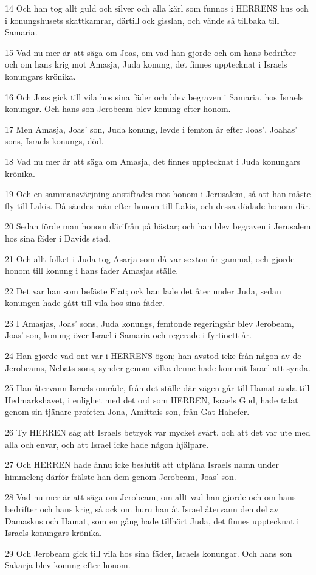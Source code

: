 \par 14 Och han tog allt guld och silver och alla kärl som funnos i HERRENS hus och i konungshusets skattkamrar, därtill ock gisslan, och vände så tillbaka till Samaria.
\par 15 Vad nu mer är att säga om Joas, om vad han gjorde och om hans bedrifter och om hans krig mot Amasja, Juda konung, det finnes upptecknat i Israels konungars krönika.
\par 16 Och Joas gick till vila hos sina fäder och blev begraven i Samaria, hos Israels konungar. Och hans son Jerobeam blev konung efter honom.
\par 17 Men Amasja, Joas' son, Juda konung, levde i femton år efter Joas', Joahas' sons, Israels konungs, död.
\par 18 Vad nu mer är att säga om Amasja, det finnes upptecknat i Juda konungars krönika.
\par 19 Och en sammansvärjning anstiftades mot honom i Jerusalem, så att han måste fly till Lakis. Då sändes män efter honom till Lakis, och dessa dödade honom där.
\par 20 Sedan förde man honom därifrån på hästar; och han blev begraven i Jerusalem hos sina fäder i Davids stad.
\par 21 Och allt folket i Juda tog Asarja som då var sexton år gammal, och gjorde honom till konung i hans fader Amasjas ställe.
\par 22 Det var han som befäste Elat; ock han lade det åter under Juda, sedan konungen hade gått till vila hos sina fäder.
\par 23 I Amasjas, Joas' sons, Juda konungs, femtonde regeringsår blev Jerobeam, Joas' son, konung över Israel i Samaria och regerade i fyrtioett år.
\par 24 Han gjorde vad ont var i HERRENS ögon; han avstod icke från någon av de Jerobeams, Nebats sons, synder genom vilka denne hade kommit Israel att synda.
\par 25 Han återvann Israels område, från det ställe där vägen går till Hamat ända till Hedmarkshavet, i enlighet med det ord som HERREN, Israels Gud, hade talat genom sin tjänare profeten Jona, Amittais son, från Gat-Hahefer.
\par 26 Ty HERREN såg att Israels betryck var mycket svårt, och att det var ute med alla och envar, och att Israel icke hade någon hjälpare.
\par 27 Och HERREN hade ännu icke beslutit att utplåna Israels namn under himmelen; därför frälste han dem genom Jerobeam, Joas' son.
\par 28 Vad nu mer är att säga om Jerobeam, om allt vad han gjorde och om hans bedrifter och hans krig, så ock om huru han åt Israel återvann den del av Damaskus och Hamat, som en gång hade tillhört Juda, det finnes upptecknat i Israels konungars krönika.
\par 29 Och Jerobeam gick till vila hos sina fäder, Israels konungar. Och hans son Sakarja blev konung efter honom.

